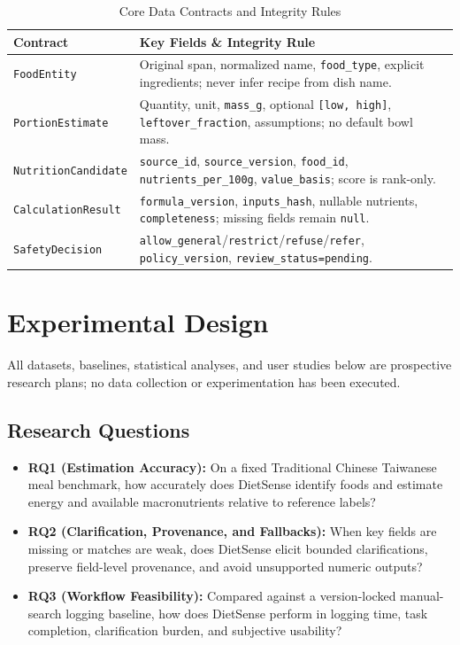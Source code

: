 \documentclass[conference]{IEEEtran}
\begin{document}
\begin{table}[t]
\centering
\caption{Core Data Contracts and Integrity Rules}
\label{tab:contracts}
\renewcommand{\arraystretch}{1.12}
\begin{tabularx}{\columnwidth}{@{}l X@{}}
\toprule
\textbf{Contract} & \textbf{Key Fields \& Integrity Rule} \\
\midrule
\texttt{FoodEntity} & Original span, normalized name, \texttt{food\_type}, explicit ingredients; never infer recipe from dish name. \\
\texttt{PortionEstimate} & Quantity, unit, \texttt{mass\_g}, optional \texttt{[low, high]}, \texttt{leftover\_fraction}, assumptions; no default bowl mass. \\
\texttt{NutritionCandidate} & \texttt{source\_id}, \texttt{source\_version}, \texttt{food\_id}, \texttt{nutrients\_per\_100g}, \texttt{value\_basis}; score is rank-only. \\
\texttt{CalculationResult} & \texttt{formula\_version}, \texttt{inputs\_hash}, nullable nutrients, \texttt{completeness}; missing fields remain \texttt{null}. \\
\texttt{SafetyDecision} & \texttt{allow\_general}/\texttt{restrict}/\texttt{refuse}/\texttt{refer}, \texttt{policy\_version}, \texttt{review\_status=pending}. \\
\bottomrule
\end{tabularx}
\end{table}

\section{Experimental Design}
All datasets, baselines, statistical analyses, and user studies below are prospective research plans; no data collection or experimentation has been executed.

\subsection{Research Questions}
\begin{itemize}
    \item \textbf{RQ1 (Estimation Accuracy):} On a fixed Traditional Chinese Taiwanese meal benchmark, how accurately does DietSense identify foods and estimate energy and available macronutrients relative to reference labels?
    \item \textbf{RQ2 (Clarification, Provenance, and Fallbacks):} When key fields are missing or matches are weak, does DietSense elicit bounded clarifications, preserve field-level provenance, and avoid unsupported numeric outputs?
    \item \textbf{RQ3 (Workflow Feasibility):} Compared against a version-locked manual-search logging baseline, how does DietSense perform in logging time, task completion, clarification burden, and subjective usability?
\end{itemize}
\end{document}
